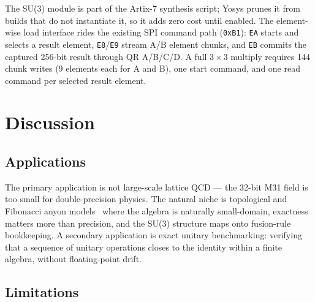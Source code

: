 \documentclass[conference]{IEEEtran}
\begin{document}
The SU(3) module is part of the Artix-7 synthesis script; Yosys prunes it
from builds that do not instantiate it, so it adds zero cost until enabled.
The element-wise load interface rides the existing SPI command path
(\texttt{0xB1}): \texttt{EA} starts and selects a result element,
\texttt{E8}/\texttt{E9} stream A/B element chunks, and \texttt{EB} commits
the captured 256-bit result through QR A/B/C/D. A full $3\times3$ multiply
requires 144 chunk writes (9 elements each for A and B), one start command,
and one read command per selected result element.

\section{Discussion}

\subsection{Applications}

The primary application is not large-scale lattice QCD --- the 32-bit M31
field is too small for double-precision physics. The natural niche is
topological and Fibonacci anyon models~\cite{freedman2000} where the
algebra is naturally small-domain, exactness matters more than precision,
and the SU(3) structure maps onto fusion-rule bookkeeping. A secondary
application is exact unitary benchmarking: verifying that a sequence of
unitary operations closes to the identity within a finite algebra, without
floating-point drift.

\subsection{Limitations}
\end{document}
